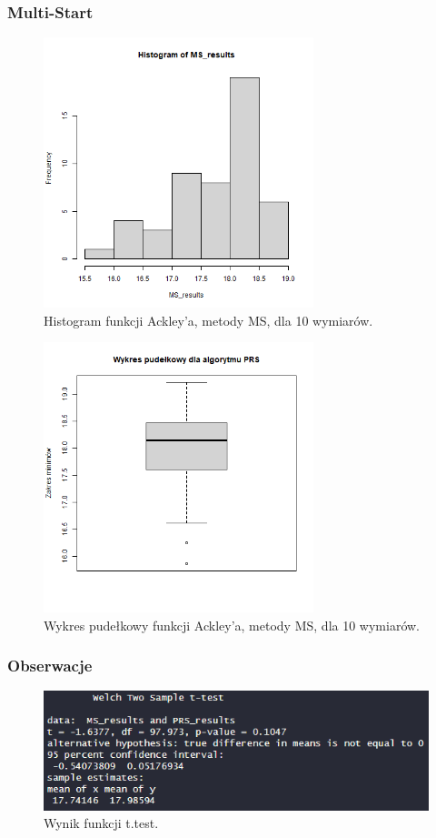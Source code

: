 \documentclass{lab}
\begin{document}
\subsubsection{Multi-Start}
\begin{figure}[H]
  \centering
  \includegraphics[width=0.7\textwidth]{img/dim10_MS_Ackley_his.png}
  \caption{Histogram funkcji Ackley'a, metody MS, dla 10 wymiarów.}
\end{figure}
\begin{figure}[H]
  \centering
  \includegraphics[width=0.7\textwidth]{img/dim10_MS_Ackley.png}
  \caption{Wykres pudełkowy funkcji Ackley'a, metody MS, dla 10 wymiarów.}
\end{figure}

\subsubsection{Obserwacje}
 \begin{figure}[H]
     \centering
     \includegraphics[width=0.9\linewidth]{img/T4.png}
     \caption{Wynik funkcji t.test.}
     \label{fig:enter-label}
 \end{figure}
\end{document}
